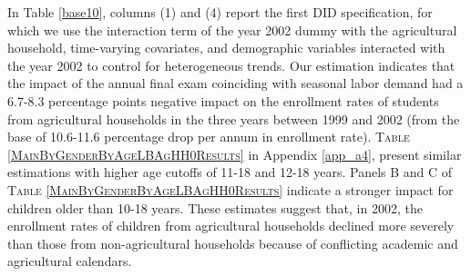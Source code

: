 \documentclass[12pt,letterpaper]{article}
\newcommand{\0}{\ensuremath{\mbox{\boldmath $0$}}}
\begin{document}
In Table \ref{base10}, columns (1) and (4) report the first DID specification, for which we use the interaction term of the year 2002 dummy with the agricultural household, time-varying covariates, and demographic variables interacted with the year 2002 to control for heterogeneous trends.
Our estimation indicates that the impact of the annual final exam coinciding with seasonal labor demand had a 6.7-8.3 percentage points negative impact on the enrollment rates of students from agricultural households in the three years between 1999 and 2002 (from the base of  10.6-11.6 percentage drop per annum in enrollment rate). \textsc{\small Table \ref{MainByGenderByAgeLBAgHH0Results}} in Appendix \ref{app_a4}, present similar estimations with higher age cutoffs of 11-18 and 12-18 years. Panels B and C of \textsc{Table \ref{MainByGenderByAgeLBAgHH0Results}} indicate a stronger impact for children older than 10-18 years. These estimates suggest that, in 2002, the enrollment rates of children from agricultural households declined more severely than those from non-agricultural households because of conflicting academic and agricultural calendars.
\end{document}
